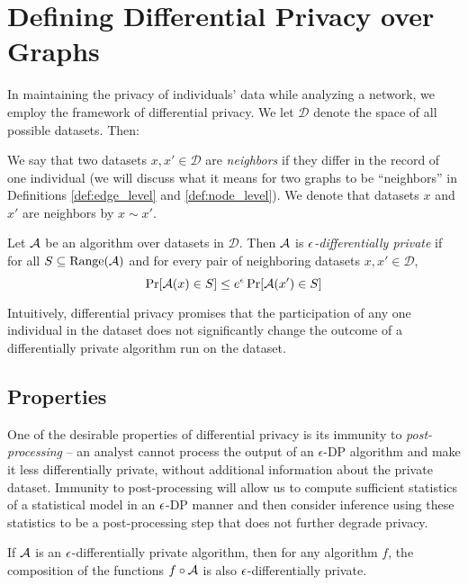\section{Defining Differential Privacy over Graphs}

In maintaining the privacy of individuals' data while analyzing a network, we employ the framework of differential privacy.  We let $\mathcal{D}$ denote the space of all possible datasets. Then:

\begin{definition}
\label{def:neighbors}
 We say that two datasets $x, x' \in \mathcal{D}$ are \emph{neighbors} if 
they differ in the record of one individual (we will discuss what it means for two graphs to be ``neighbors'' in Definitions \ref{def:edge_level} and \ref{def:node_level}). We denote that datasets $x$ and $x'$ are neighbors by $x \sim x'$.  
\end{definition}

\begin{definition} Let $\mathcal{A}$ be an algorithm over datasets in $\mathcal{D}$. Then $\mathcal{A}$ is \emph{$\epsilon$-differentially private} if for all $S \subseteq \text{Range}(\mathcal{A})$ and for every pair of neighboring datasets $x, x' \in \mathcal{D}$,
	\begin{equation*}
	\Pr[\mathcal{A}(x) \in S] \leq e^{\epsilon} \Pr[\mathcal{A}(x') \in S]
	\end{equation*}
\end{definition}

Intuitively, differential privacy promises that the participation of any one individual in the dataset does not significantly change the outcome of a differentially private algorithm run on the dataset. 

\subsection{Properties}

One of the desirable properties of differential privacy is its immunity to \emph{post-processing} -- an analyst cannot process the output of an $\epsilon$-DP algorithm and make it less differentially private, without additional information about the private dataset. Immunity to post-processing will allow us to compute sufficient statistics of a statistical model in an $\epsilon$-DP manner and then consider inference using these statistics to be a post-processing step that does not further degrade privacy.
\begin{property}
If $\mathcal{A}$ is an $\epsilon$-differentially private algorithm, then for any algorithm $f$, the composition of the functions $f \circ \mathcal{A}$ is also $\epsilon$-differentially private. 	
\end{property}

